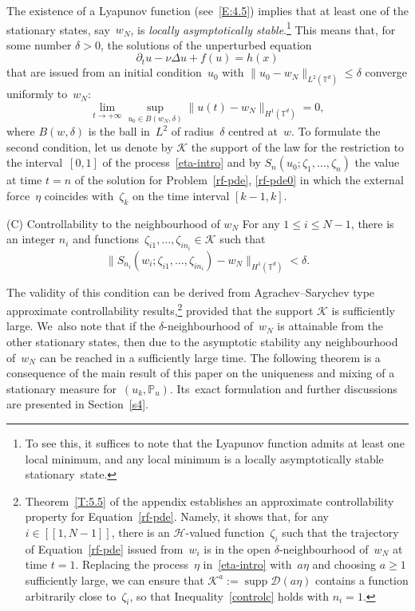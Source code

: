 \documentclass[11pt]{article}
\theoremstyle{plain}
\theoremstyle{definition}
\newtheorem*{namedassumption}{\jepassumptionname}
\newenvironment{enonce*}[1]{\def\jepassumptionname{#1}\begin{namedassumption}}{\end{namedassumption}}
\let\mathcal\mathscr
\theoremstyle{plain}
\numberwithin{equation}{section}
\let\p\partial
\let\ty\infty
\newcommand{\IP}{{\mathbb P}}
\newcommand{\T}{{\mathbb T}}
\DeclareMathOperator{\supp}{supp}
\newcommand{\DD}{{\mathcal D}}
\newcommand{\HH}{{\mathcal H}}
\newcommand{\KK}{{\mathcal K}}
\begin{document}
The existence of a Lyapunov function (see~\eqref{E:4.5}) implies that at least one of the stationary states, say~$w_N$, is \emph{locally asymptotically stable}.\footnote{To see this, it suffices to note that the Lyapunov function admits at least one local minimum, and any local minimum is a locally asymptotically stable stationary~state.} This means that, for some number $\delta>0$, the solutions of the unperturbed equation
\begin{equation} \label{unperturbed-eq}
\p_t u-\nu\Delta u+f(u)=h(x)
\end{equation}
that are issued from an initial condition~$u_0$ with $\|u_0-w_N\|_{L^2(\T^d)} \le \delta$ converge uniformly to~$w_N$:
\begin{equation} \label{wNconvergence}
\lim_{t\to +\ty}\sup_{u_0\in B(w_N,\delta)}\|u(t)-w_N\|_{H^1(\T^d)}=0,
\end{equation}
where $B(w,\delta)$ is the ball in~$L^2$ of radius~$\delta$ centred at~$w$. To formulate the second condition, let us denote by $\KK$ the support of the law for the restriction to the interval~$[0,1]$ of the process~\eqref{eta-intro} and by $S_n(u_0;\zeta_1,\dots,\zeta_n)$ the value at time $t=n$ of the solution for Problem~\eqref{rf-pde}, \eqref{rf-pde0} in which the external force~$\eta$ coincides with~$\zeta_k$ on the time interval $[k-1,k]$.

\begin{enonce*}{\hypertarget{C}{(C)} Controllability to the neighbourhood of $w_N$}
For any $1\le i\le N-1$, there is an integer $n_i$ and functions~$\zeta_{i1},\dots,\zeta_{in_i}\in \KK$ such that \begin{equation}\label{controlc}
\|S_{n_i}(w_i;\zeta_{i1},\dots,\zeta_{in_i})-w_N\|_{H^1(\T^d)} < \delta.
\end{equation}
\end{enonce*}

The validity of this condition can be derived from Agrachev--Sarychev type approximate controllability results,\footnote{Theorem~\ref{T:5.5} of the appendix establishes an approximate controllability property for Equation~\eqref{rf-pde}. Namely, it shows that, for any $i\in[\![1,N-1]\!]$, there is an $\HH$-valued function~$\zeta_i$ such that the trajectory of Equation~\eqref{rf-pde} issued from~$w_i$ is in the open $\delta$-neighbourhood of~$w_N$ at time $t=1$. Replacing the process~$\eta$ in~\eqref{eta-intro} with~$a\eta$ and choosing $a\ge1$ sufficiently large, we can ensure that $\KK^a:=\supp \DD(a\eta)$ contains a function arbitrarily close to~$\zeta_i$, so that Inequality~\eqref{controlc} holds with $n_i=1$.} provided that the support $\KK$ is sufficiently large. We~also note that if the $\delta$-neighbourhood of~$w_N$ is attainable from the other stationary states, then due to the asymptotic stability any neighbourhood of~$w_N$ can be reached in a sufficiently large time. The following theorem is a consequence of the main result of this paper on the uniqueness and mixing of a stationary measure for~$(u_k,\IP_u)$. Its~exact formulation and further discussions are presented in Section~\ref{s4}.
\end{document}
